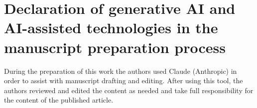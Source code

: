 \documentclass[review,3p,authoryear]{elsarticle}
\begin{document}
\section*{Declaration of generative AI and AI-assisted technologies in the manuscript preparation process}

During the preparation of this work the authors used Claude (Anthropic) in order to assist with manuscript drafting and editing. After using this tool, the authors reviewed and edited the content as needed and take full responsibility for the content of the published article.


\end{document}
